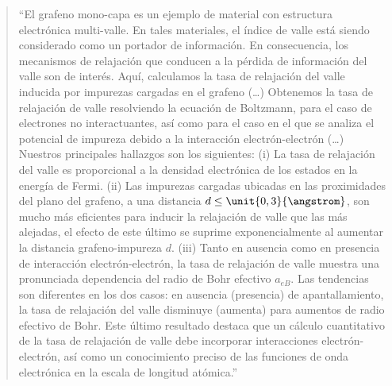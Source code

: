 \blockquote[]{``El grafeno mono-capa es un ejemplo de material 
	con estructura electrónica multi-valle. En tales materiales, el índice de valle 
	está siendo considerado como un portador de información. En consecuencia, los 
	mecanismos de relajación que conducen a la pérdida de información del valle son 
	de interés. Aquí, calculamos la tasa de relajación del valle inducida por 
	impurezas cargadas en el grafeno (\dots) Obtenemos la tasa de relajación de 
	valle resolviendo la ecuación de Boltzmann, para el caso de electrones no 
	interactuantes, así como para el caso en el que se analiza el potencial de 
	impureza debido a la interacción electrón-electrón (\dots) Nuestros principales 
	hallazgos son los siguientes: (i) La tasa de relajación del valle es 
	proporcional a la densidad electrónica de los estados en la energía de Fermi. 
	(ii) Las impurezas cargadas ubicadas en las proximidades del plano del grafeno, 
	a una distancia $ d \leq \unit{0,3}{\angstrom} $, son mucho más eficientes para 
	inducir la relajación de valle que las más alejadas, el efecto de este último se 
	suprime exponencialmente al aumentar la distancia grafeno-impureza $ d $. (iii) 
	Tanto en ausencia como en presencia de interacción electrón-electrón, la tasa de 
	relajación de valle muestra una pronunciada dependencia del radio de Bohr 
	efectivo $ a_{eB} $. Las tendencias son diferentes en los dos casos: en ausencia 
	(presencia) de apantallamiento, la tasa de relajación del valle disminuye 
	(aumenta) para aumentos de radio efectivo de Bohr. Este último resultado destaca 
	que un cálculo cuantitativo de la tasa de relajación de valle debe incorporar 
	interacciones electrón-electrón, así como un conocimiento preciso de las 
	funciones de onda electrónica en la escala de longitud atómica.''}
	

